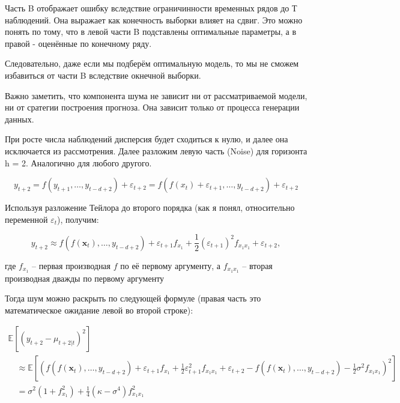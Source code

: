 \documentclass[a4paper,12pt]{article}
\def \e{\varepsilon}
\def \e{\varepsilon}
\begin{document}
Часть B отображает ошибку вследствие ограничинности временных рядов до Т наблюдений. Она выражает как конечность выборки влияет на сдвиг. Это можно понять по тому, что в левой части B подставлены оптимальные параметры, а в правой - оценённые по конечному ряду.

 Следовательно, даже если мы подберём оптимальную модель, то мы не сможем избавиться от части B  вследствие окнечной выборки.
 
Важно заметить, что компонента шума не зависит ни от рассматриваемой модели, ни от сратегии построения прогноза. Она зависит только от процесса генерации данных.



При росте числа наблюдений дисперсия будет сходиться к нулю, и далее она исключается из рассмотрения. Далее разложим левую часть (Noise) для горизонта h = 2. Аналогично для любого другого.

\[
y_{t+2}=f\left(y_{t+1}, \ldots, y_{t-d+2}\right)+\varepsilon_{t+2}=f\left(f\left(x_{t}\right)+\varepsilon_{t+1}, \ldots, y_{t-d+2}\right)+\varepsilon_{t+2}
\]

Используя разложение Тейлора до второго порядка (как я понял, относительно переменной $ \e_t $), получим:

\[
y_{t+2} \approx f\left(f\left(\boldsymbol{x}_{t}\right), \ldots, y_{t-d+2}\right)+\varepsilon_{t+1} f_{x_{1}}+\frac{1}{2}\left(\varepsilon_{t+1}\right)^{2} f_{x_{1} x_{1}}+\varepsilon_{t+2},
\]

где $ f_{x_{1}} $ -- первая производная $ f $ по её первому аргументу, а $ f_{x_{1} x_{1}} $ -- вторая производная дважды по первому аргументу


 Тогда шум можно раскрыть по следующей формуле (правая часть это математическое ожидание левой во второй строке):
 
 \[
 \begin{array}{l}{\mathbb{E}\left[\left(y_{t+2}-\mu_{t+2 | t}\right)^{2}\right]} \\ {\quad \approx \mathbb{E}\left[\left(f\left(f\left(\boldsymbol{x}_{t}\right), \ldots, y_{t-d+2}\right)+\varepsilon_{t+1} f_{x_{1}}+\frac{1}{2} \varepsilon_{t+1}^{2} f_{x_{1} x_{1}}+\varepsilon_{t+2}-f\left(f\left(\boldsymbol{x}_{t}\right), \ldots, y_{t-d+2}\right)-\frac{1}{2} \sigma^{2} f_{x_{1} x_{1}}\right)^{2}\right]} \\ {\quad=\sigma^{2}\left(1+f_{x_{1}}^{2}\right)+\frac{1}{4}\left(\kappa-\sigma^{4}\right) f_{x_{1} x_{1}}^{2}}\end{array}
 \]
 
\end{document}
